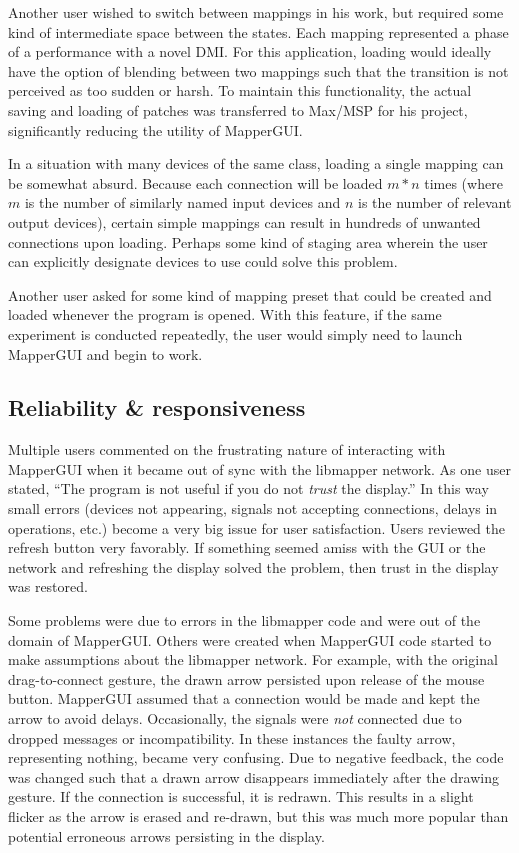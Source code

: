 Another user wished to switch between mappings in his work, but required some kind of intermediate space between the states. Each mapping represented a phase of a performance with a novel DMI. For this application, loading would ideally have the option of blending between two mappings such that the transition is not perceived as too sudden or harsh. To maintain this functionality, the actual saving and loading of patches was transferred to Max/MSP for his project, significantly reducing the utility of MapperGUI.

In a situation with many devices of the same class, loading a single mapping can be somewhat absurd. Because each connection will be loaded $m*n$ times (where $m$ is the number of similarly named input devices and $n$ is the number of relevant output devices), certain simple mappings can result in hundreds of unwanted connections upon loading. Perhaps some kind of staging area wherein the user can explicitly designate devices to use could solve this problem.

Another user asked for some kind of mapping preset that could be created and loaded whenever the program is opened. With this feature, if the same experiment is conducted repeatedly, the user would simply need to launch MapperGUI and begin to work.
	

	\subsection{Reliability \& responsiveness} %
	\label{sub:reliability_and_responsiveness}

Multiple users commented on the frustrating nature of interacting with MapperGUI when it became out of sync with the libmapper network. As one user stated, ``The program is not useful if you do not \emph{trust} the display.'' In this way small errors (devices not appearing, signals not accepting connections, delays in operations, etc.) become a very big issue for user satisfaction. Users reviewed the refresh button very favorably. If something seemed amiss with the GUI or the network and refreshing the display solved the problem, then trust in the display was restored.

Some problems were due to errors in the libmapper code and were out of the domain of MapperGUI. Others were created when MapperGUI code started to make assumptions about the libmapper network. For example, with the original drag-to-connect gesture, the drawn arrow persisted upon release of the mouse button. MapperGUI assumed that a connection would be made and kept the arrow to avoid delays. Occasionally, the signals were \emph{not} connected due to dropped messages or incompatibility. In these instances the faulty arrow, representing nothing, became very confusing. Due to negative feedback, the code was changed such that a drawn arrow disappears immediately after the drawing gesture. If the connection is successful, it is redrawn. This results in a slight flicker as the arrow is erased and re-drawn, but this was much more popular than potential erroneous arrows persisting in the display.

